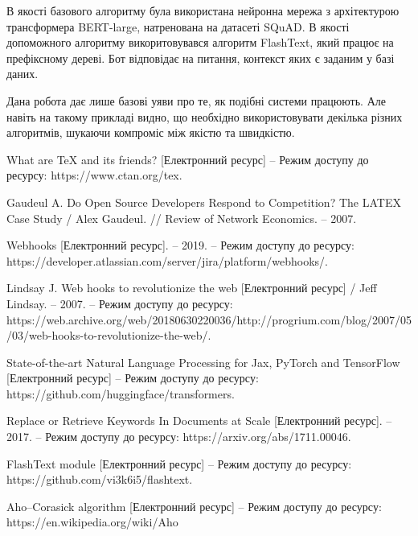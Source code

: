 \documentclass[a4paper,14pt]{extreport}
\begin{document}
    В якості базового алгоритму була використана нейронна мережа з архітектурою трансформера BERT-large, натренована на датасеті SQuAD. В якості допоможного алгоритму викоритовувався алгоритм FlashText, який працює на префіксному дереві. Бот відповідає на питання, контекст яких є заданим у базі даних.

    Дана робота дає лише базові уяви про те, як подібні системи працюють. Але навіть на такому прикладі видно, що необхідно використовувати декілька різних алгоритмів, шукаючи компроміс між якістю та швидкістю.

\newpage
\renewcommand\bibname{ПЕРЕЛІК ДЖЕРЕЛ ПОСИЛАННЯ}
\begin{thebibliography}{9}
    What are TeX and its friends? [Електронний ресурс] – Режим доступу до ресурсу: https://www.ctan.org/tex.

    Gaudeul A. Do Open Source Developers Respond to Competition? The LATEX Case Study / Alex Gaudeul. // Review of Network Economics. – 2007.

    Webhooks [Електронний ресурс]. – 2019. – Режим доступу до ресурсу: https://developer.atlassian.com/server/jira/platform/webhooks/.

    Lindsay J. Web hooks to revolutionize the web [Електронний ресурс] / Jeff Lindsay. – 2007. – Режим доступу до ресурсу: https://web.archive.org/web/20180630220036/http://progrium.com/blog/2007/05/03/web-hooks-to-revolutionize-the-web/.
    
    State-of-the-art Natural Language Processing for Jax, PyTorch and TensorFlow [Електронний ресурс] – Режим доступу до ресурсу: https://github.com/huggingface/transformers.

    Replace or Retrieve Keywords In Documents at Scale [Електронний ресурс]. – 2017. – Режим доступу до ресурсу: https://arxiv.org/abs/1711.00046.

    FlashText module [Електронний ресурс] – Режим доступу до ресурсу: https://github.com/vi3k6i5/flashtext.

    Aho–Corasick algorithm [Електронний ресурс] – Режим доступу до ресурсу: https://en.wikipedia.org/wiki/Aho%
\end{thebibliography}


\newpage
\end{document}
